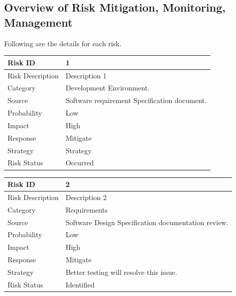 \documentclass[oneside,a4paper,12pt]{report}
\begin{document}
\subsection{Overview of Risk Mitigation, Monitoring, Management}


Following are the details for each risk.
\begin{table}[!htbp]
\begin{center}
\def\arraystretch{1.5}
\begin{tabularx}{\textwidth}{| l | X |}
\hline
Risk ID	& 1 \\ \hline
Risk Description	& Description 1 \\ \hline
Category	& Development Environment. \\ \hline
Source	& Software requirement Specification document. \\ \hline
Probability	& Low \\ \hline
Impact	& High \\ \hline
Response	& Mitigate \\ \hline
Strategy	& Strategy \\ \hline
Risk Status	& Occurred \\ \hline
\end{tabularx}
\end{center}
\label{tab:risk1}
\end{table}

\begin{table}[!htbp]
\begin{center}
\def\arraystretch{1.5}
\begin{tabularx}{\textwidth}{| l | X |}
\hline
Risk ID	& 2 \\ \hline
Risk Description	& Description 2 \\ \hline
Category	& Requirements \\ \hline
Source	& Software Design Specification documentation review. \\ \hline
Probability	& Low \\ \hline
Impact	& High \\ \hline
Response	& Mitigate \\ \hline
Strategy	& Better testing will resolve this issue.  \\ \hline
Risk Status	& Identified \\ \hline
\end{tabularx}
\end{center}
\label{tab:risk2}
\end{table}
\end{document}
